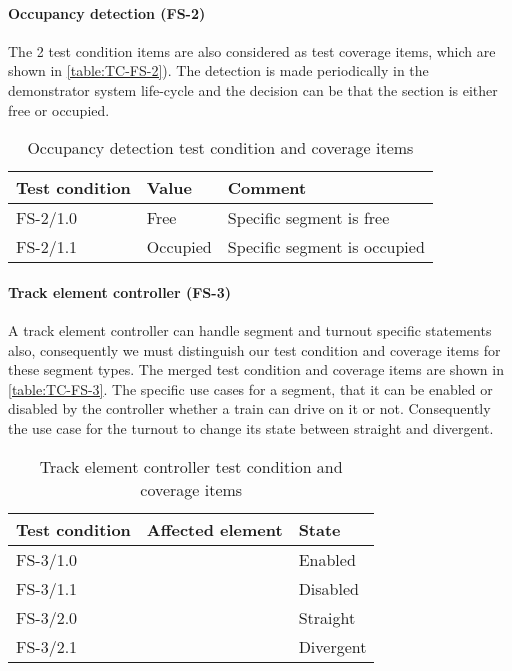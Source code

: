 \paragraph{Occupancy detection (FS-2)}
The 2 test condition items are also considered as test coverage items, which are shown in \autoref{table:TC-FS-2}). The detection is made periodically in the demonstrator system life-cycle and the decision can be that the section is either free or occupied.
\begin{table}[H]
	\caption{Occupancy detection test condition and coverage items}
	\label{table:TC-FS-2}
	\begin{center}
		\renewcommand{\arraystretch}{1.8}
		\begin{tabu} 
			to 0.9 \textwidth
			{  X[c] X[c] X[c] }
			\toprule
			Test condition & Value    & Comment             \\ \midrule
			FS-2/1.0       & Free     & Specific segment is free     \\
			FS-2/1.1       & Occupied & Specific segment is occupied \\ \bottomrule
		\end{tabu}
	\end{center}
\end{table}


\paragraph{Track element controller (FS-3)}
A track element controller can handle segment and turnout specific statements also, consequently we must distinguish our test condition and coverage items for these segment types. The merged test condition and coverage items are shown in \autoref{table:TC-FS-3}. The specific use cases for a segment, that it can be enabled or disabled by the controller whether a train can drive on it or not. Consequently the use case for the turnout to change its state between straight and divergent.
\begin{table}[H]
	\caption{Track element controller test condition and coverage items}
	\label{table:TC-FS-3}
	\begin{center}
		\renewcommand{\arraystretch}{1.8}
		\begin{tabu} 
			to 0.9 \textwidth
			{  X[c] X[c] X[c] }
			\toprule
			Test condition & Affected element               & State     \\ \midrule
			FS-3/1.0       &  & Enabled   \\
			FS-3/1.1       &                                & Disabled  \\
			FS-3/2.0       &  & Straight  \\
			FS-3/2.1       &                                & Divergent \\ \bottomrule
		\end{tabu}
	\end{center}
\end{table} 

